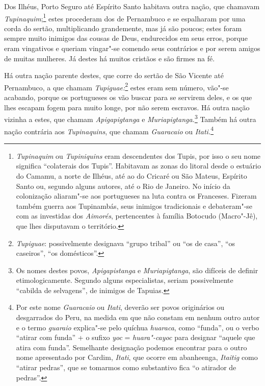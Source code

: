  Dos Ilhéus, Porto Seguro até Espírito Santo habitava outra nação, que
chamavam \textit{Tupinaquim};\footnote{ \textit{Tupinaquim} ou
\textit{Tupiniquins} eram descendentes dos Tupis, por isso o seu nome
significa ``colaterais dos Tupis''. Habitavam as zonas do litoral desde o
estuário do Camamu, a norte de Ilhéus, até ao do Cricaré ou São Mateus,
Espírito Santo ou, segundo alguns autores, até o Rio de Janeiro. No
início da colonização aliaram"-se aos portugueses na luta contra os
Franceses. Fizeram também guerra aos Tupinambás, seus inimigos
tradicionais e debateram"-se com as investidas dos \textit{Aimorés}, 
pertencentes à família Botocudo (Macro"-Jê), que lhes disputavam o
território.} estes procederam dos de Pernambuco e se
espalharam por uma corda do sertão, multiplicando grandemente, mas já
são poucos; estes foram sempre muito inimigos das cousas de Deus,
endurecidos em seus erros, porque eram vingativos e queriam vingar"-se
comendo seus contrários e por serem amigos de muitas mulheres. Já
destes há muitos cristãos e são firmes na fé.

 Há outra nação parente destes, que corre do sertão de São Vicente até
Pernambuco, a que chamam \textit{Tupiguae:}\footnote{ \textit{Tupiguae}: 
possivelmente designava ``grupo tribal'' ou ``os de casa'', ``os
caseiros'', ``os domésticos''.} estes eram sem número, vão"-se
acabando, porque os portugueses os vão buscar para se servirem deles, e
os que lhes escapam fogem para muito longe, por não serem escravos. Há
outra nação vizinha a estes, que chamam \textit{Apigapigtanga} e 
\textit{Muriapigtanga.}\footnote{ Os nomes destes povos,
\textit{Apigapistanga} e \textit{Muriapigtanga}, são difíceis de
definir etimologicamente. Segundo alguns especialistas, seriam
possivelmente ``cabilda de selvagens'', de inimigos de Tapuias.} 
Também há outra nação contrária aos \textit{Tupinaquins}, que chamam
\textit{Guaracaio} ou \textit{Itati.}\footnote{ Por este nome
\textit{Guaracaio} ou \textit{Itati}, deverão ser povos originários ou
desgarrados do Peru, na medida em que não constam em nenhum outro autor
e o termo \textit{guaraio} explica"-se pelo quíchua
\textit{huaraca}, como ``funda'', ou o verbo ``atirar com funda'' + o
sufixo \textit{yoc} = \textit{huara"-cayoc} para designar ``aquele que
atira com funda''. Semelhante designação podemos encontrar para o outro
nome apresentado por Cardim, \textit{Itati}, que ocorre em abanheenga,
\textit{Itaitig} como ``atirar pedras'', que se tomarmos como substantivo
fica ``o atirador de pedras''.} 

